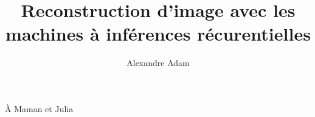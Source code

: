 \documentclass[
  normalmargins,
  11pt,
  openany,
  onehalfspacing,
]{ut-thesis}
\author{Alexandre Adam}
\title{Reconstruction d'image avec les machines à inférences récurentielles}
\begin{document}
  \frontmatter
    \maketitle

    \begin{resume}
    \end{resume}
    \begin{abstract}
    \end{abstract}

    \tableofcontents
    \listoftables
    \listoffigures
    \printglossaries

        \clearpage
    \begin{dedication}
      À Maman et Julia
    \end{dedication}
    \begin{acknowledgements}
            

           


    \end{acknowledgements}
  \mainmatter
        \glsaddall
    



{\footnotesize
  
}

  \appendix
  
  

\end{document}
